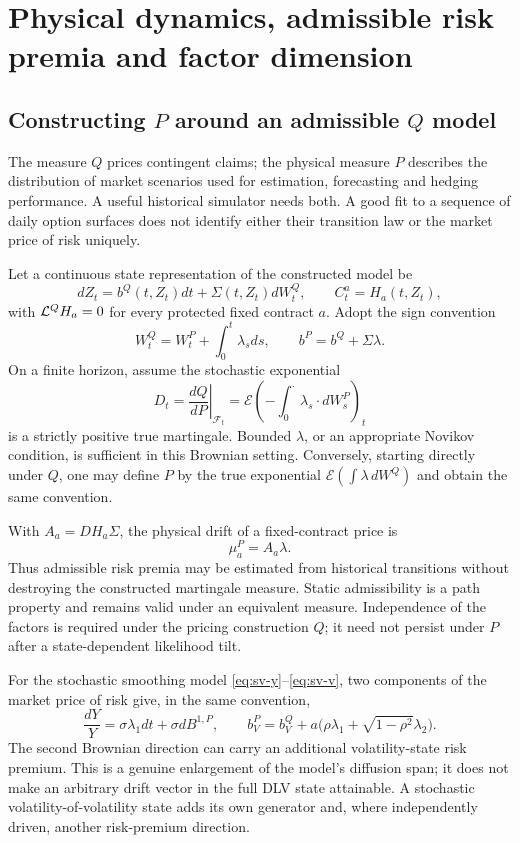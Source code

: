 \documentclass[11pt,a4paper]{article}
\numberwithin{equation}{section}
\theoremstyle{definition}\newtheorem{definition}[theorem]{Definition}
\theoremstyle{remark}\newtheorem{remark}[theorem]{Remark}
\newcommand{\F}{\mathcal F}\newcommand{\G}{\mathcal G}
\begin{document}
\section{Physical dynamics, admissible risk premia and factor dimension}
\label{sec:pq}
\subsection{Constructing \texorpdfstring{$P$}{P} around an admissible \texorpdfstring{$Q$}{Q} model}
The measure $Q$ prices contingent claims; the physical measure $P$ describes the distribution of market scenarios used for estimation, forecasting and hedging performance. A useful historical simulator needs both. A good fit to a sequence of daily option surfaces does not identify either their transition law or the market price of risk uniquely.

Let a continuous state representation of the constructed model be
\[
 dZ_t=b^Q(t,Z_t)dt+\Sigma(t,Z_t)dW_t^Q,
 \qquad C_t^a=H_a(t,Z_t),
\]
with $\mathcal L^QH_a=0$ for every protected fixed contract $a$. Adopt the sign convention
\begin{equation}
 W_t^Q=W_t^P+\int_0^t\lambda_sds,
 \qquad b^P=b^Q+\Sigma\lambda.
 \label{eq:girsanov}
\end{equation}
On a finite horizon, assume the stochastic exponential
\begin{equation}
 D_t=\left.\frac{dQ}{dP}\right|_{\F_t}
 =\mathcal E\left(-\int_0^\cdot\lambda_s\cdot dW_s^P\right)_t
 \label{eq:density-ratio}
\end{equation}
is a strictly positive true martingale. Bounded $\lambda$, or an appropriate Novikov condition, is sufficient in this Brownian setting. Conversely, starting directly under $Q$, one may define $P$ by the true exponential $\mathcal E(\int\lambda\,dW^Q)$ and obtain the same convention.

With $A_a=DH_a\Sigma$, the physical drift of a fixed-contract price is
\begin{equation}
 \mu_a^P=A_a\lambda.
 \label{eq:asset-span}
\end{equation}
Thus admissible risk premia may be estimated from historical transitions without destroying the constructed martingale measure. Static admissibility is a path property and remains valid under an equivalent measure. Independence of the factors is required under the pricing construction $Q$; it need not persist under $P$ after a state-dependent likelihood tilt.

For the stochastic smoothing model \eqref{eq:sv-y}--\eqref{eq:sv-v}, two components of the market price of risk give, in the same convention,
\[
 \frac{dY}{Y}=\sigma\lambda_1dt+\sigma dB^{1,P},\qquad
 b_V^P=b_V^Q+a\bigl(\rho\lambda_1+\sqrt{1-\rho^2}\lambda_2\bigr).
\]
The second Brownian direction can carry an additional volatility-state risk premium. This is a genuine enlargement of the model's diffusion span; it does not make an arbitrary drift vector in the full DLV state attainable. A stochastic volatility-of-volatility state adds its own generator and, where independently driven, another risk-premium direction.
\end{document}
